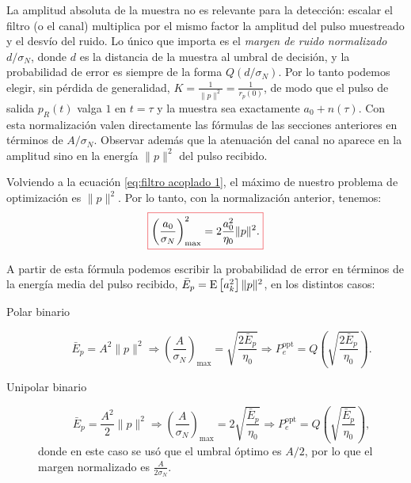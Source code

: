 \begin{remark}\label{rem:margen ruido}
    La amplitud absoluta de la muestra no es relevante para la detección: escalar el filtro (o el canal) multiplica por el mismo factor la amplitud del pulso muestreado y el desvío del ruido. Lo único que importa es el \emph{margen de ruido normalizado} $d/\sigma_N$, donde $d$ es la distancia de la muestra al umbral de decisión, y la probabilidad de error es siempre de la forma $Q(d/\sigma_N)$. Por lo tanto podemos elegir, sin pérdida de generalidad, $K=\frac{1}{\|p\|^2}=\frac{1}{r_p(0)}$, de modo que el pulso de salida $p_R(t)$ valga $1$ en $t=\tau$ y la muestra sea exactamente $a_0 + n(\tau)$. Con esta normalización valen directamente las fórmulas de las secciones anteriores en términos de $A/\sigma_N$. Observar además que la atenuación del canal no aparece en la amplitud sino en la energía $\|p\|^2$ del pulso recibido.
\end{remark}

Volviendo a la ecuación \eqref{eq:filtro acoplado 1}, el máximo de nuestro problema de optimización es $\|p\|^2$. Por lo tanto, con la normalización anterior, tenemos:
\begin{equation}\label{eq:snr filtro acoplado}
\col{\left(\frac{a_0}{\sigma_N}\right)^2_{\max} = 2 \frac{a_0^2}{\eta_0} \|p\|^2.}
\end{equation}

A partir de esta fórmula podemos escribir la probabilidad de error en términos de la energía media del pulso recibido, $\bar{E}_p = \mathrm{E}\left[a_k^2\right] \|p\|^2$, en los distintos casos:
\begin{description}
    \item[Polar binario]
    \begin{equation*}
       \bar{E}_p = A^2 \|p\|^2 \Rightarrow \left(\frac{A}{\sigma_N}\right)_{\max} = \sqrt{\frac{2\bar{E}_p}{\eta_0}} \Rightarrow P_e^\text{opt} = Q\left(\sqrt{\frac{2\bar{E}_p}{\eta_0}}\right).
    \end{equation*}
    \item[Unipolar binario]
    \begin{equation*}
       \bar{E}_p = \frac{A^2}{2} \|p\|^2 \Rightarrow \left(\frac{A}{\sigma_N}\right)_{\max} = 2\sqrt{\frac{\bar{E}_p}{\eta_0}} \Rightarrow P_e^\text{opt} = Q\left(\sqrt{\frac{\bar{E}_p}{\eta_0}}\right),
    \end{equation*}
    donde en este caso se usó que el umbral óptimo es $A/2$, por lo que el margen normalizado es $\frac{A}{2\sigma_N}$.
\end{description}

